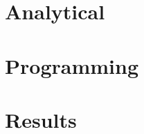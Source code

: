\documentclass{article}
\begin{document}
    \part{Analytical}
        
    \part{Programming}
        
    \part{Results}
    
    \appendix
    \begin{appendices}
        \newpage
        
        \newpage
        
    \end{appendices}
        
    \newpage
    
    
\end{document}
